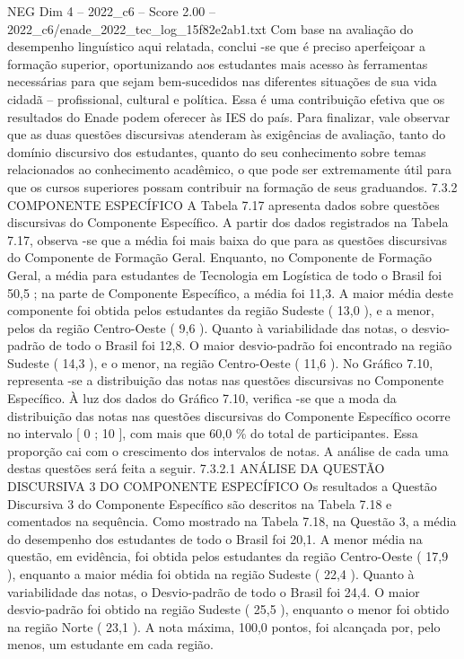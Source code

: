 \begin{textsample}{NEG Dim 4 – 2022\_c6 – Score 2.00 – 2022\_c6/enade\_2022\_tec\_log\_15f82e2ab1.txt}
Com base na avaliação do desempenho linguístico aqui relatada, conclui -se que é preciso aperfeiçoar a formação superior, oportunizando aos estudantes mais acesso às ferramentas necessárias para que sejam bem-sucedidos nas diferentes situações de sua vida cidadã – profissional, cultural e política.
Essa é uma contribuição efetiva que os resultados do Enade podem oferecer às IES do país.
Para finalizar, vale observar que as duas questões discursivas atenderam às exigências de avaliação, tanto do domínio discursivo dos estudantes, quanto do seu conhecimento sobre temas relacionados ao conhecimento acadêmico, o que pode ser extremamente útil para que os cursos superiores possam contribuir na formação de seus graduandos. 7.3.2 COMPONENTE ESPECÍFICO A Tabela 7.17 apresenta dados sobre questões discursivas do Componente Específico.
A partir dos dados registrados na Tabela 7.17, observa -se que a média foi mais baixa do que para as questões discursivas do Componente de Formação Geral.
Enquanto, no Componente de Formação Geral, a média para estudantes de Tecnologia em Logística de todo o Brasil foi 50,5 ; na parte de Componente Específico, a média foi 11,3.
A maior média deste componente foi obtida pelos estudantes da região Sudeste ( 13,0 ), e a menor, pelos da região Centro-Oeste ( 9,6 ).
Quanto à variabilidade das notas, o desvio-padrão de todo o Brasil foi 12,8.
O maior desvio-padrão foi encontrado na região Sudeste ( 14,3 ), e o menor, na região Centro-Oeste ( 11,6 ).
No Gráfico 7.10, representa -se a distribuição das notas nas questões discursivas no Componente Específico.
À luz dos dados do Gráfico 7.10, verifica -se que a moda da distribuição das notas nas questões discursivas do Componente Específico ocorre no intervalo [ 0 ; 10 ], com mais que 60,0 \% do total de participantes.
Essa proporção cai com o crescimento dos intervalos de notas.
A análise de cada uma destas questões será feita a seguir. 7.3.2.1 ANÁLISE DA QUESTÃO DISCURSIVA 3 DO COMPONENTE ESPECÍFICO Os resultados a Questão Discursiva 3 do Componente Específico são descritos na Tabela 7.18 e comentados na sequência.
Como mostrado na Tabela 7.18, na Questão 3, a média do desempenho dos estudantes de todo o Brasil foi 20,1.
A menor média na questão, em evidência, foi obtida pelos estudantes da região Centro-Oeste ( 17,9 ), enquanto a maior média foi obtida na região Sudeste ( 22,4 ).
Quanto à variabilidade das notas, o Desvio-padrão de todo o Brasil foi 24,4.
O maior desvio-padrão foi obtido na região Sudeste ( 25,5 ), enquanto o menor foi obtido na região Norte ( 23,1 ).
A nota máxima, 100,0 pontos, foi alcançada por, pelo menos, um estudante em cada região.

\end{textsample}
